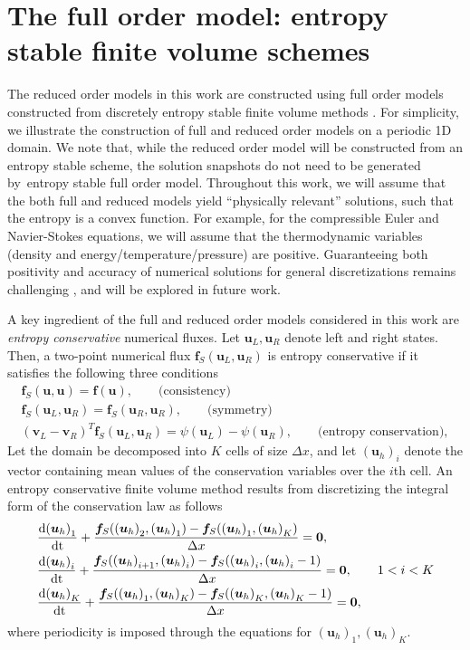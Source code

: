 \documentclass[review]{siamart171218}
\theoremstyle{assumption}
\newcommand{\td}[2]{\frac{{\rm d}#1}{{\rm d}{\rm #2}}}
\newcommand{\LRp}[1]{\left( #1 \right)}
\begin{document}
\section{The full order model: entropy stable finite volume schemes}
\label{sec:2}

The reduced order models in this work are constructed using full order models constructed from discretely entropy stable finite volume methods \cite{tadmor1987numerical}.  For simplicity, we illustrate the construction of full and reduced order models on a periodic 1D domain.  We note that, while the reduced order model will be constructed from an entropy stable scheme, the solution snapshots do not need to be generated by entropy stable full order model.  Throughout this work, we will assume that the both full and reduced models yield ``physically relevant'' solutions, such that the entropy is a convex function.  For example, for the compressible Euler and Navier-Stokes equations, we will assume that the thermodynamic variables (density and energy/temperature/pressure) are positive.  Guaranteeing both positivity and accuracy of numerical solutions for general discretizations remains challenging \cite{guermond2016invariant, guermond2019invariant}, and will be explored in future work.

A key ingredient of the full and reduced order models considered in this work are \textit{entropy conservative} numerical fluxes.  Let $\bm{u}_L, \bm{u}_R$ denote left and right states.  Then, a two-point numerical flux $\bm{f}_S(\bm{u}_L, \bm{u}_R)$ is entropy conservative if it satisfies the following three conditions
\begin{gather}
\bm{f}_S(\bm{u},\bm{u}) = \bm{f}(\bm{u}), \qquad \text{(consistency)} \label{eq:esflux}\\
\bm{f}_S(\bm{u}_L,\bm{u}_R) = \bm{f}_S(\bm{u}_R,\bm{u}_R), \qquad \text{(symmetry)} \nonumber\\
\LRp{\bm{v}_L-\bm{v}_R}^T\bm{f}_S(\bm{u}_L,\bm{u}_R) = \psi(\bm{u}_L) - \psi(\bm{u}_R), \qquad \text{(entropy conservation)}\nonumber,
\end{gather}
Let the domain be decomposed into $K$ cells of size $\Delta x$, and let ${\LRp{\bm{u}_h}_i}$ denote the vector containing mean values of the conservation variables over the $i$th cell.  An entropy conservative finite volume method results from discretizing the integral form of the conservation law as follows
\begin{align}
&\td{{\LRp{\bm{u}_h}_1}}{t} + \frac{\bm{f}_S({\LRp{\bm{u}_h}_2},\LRp{\bm{u}_h}_1)-\bm{f}_S({\LRp{\bm{u}_h}_1},{\LRp{\bm{u}_h}_K})}{\Delta x} = \bm{0}, \label{eq:nonlineqs1d}\\
&\td{{\LRp{\bm{u}_h}_i}}{t} + \frac{\bm{f}_S({\LRp{\bm{u}_h}_{i+1}},\LRp{\bm{u}_h}_i)-\bm{f}_S({\LRp{\bm{u}_h}_i},{\LRp{\bm{u}_h}_i-1})}{\Delta x} = \bm{0}, \qquad 1 < i < K \nonumber\\
&\td{{\LRp{\bm{u}_h}_K}}{t} + \frac{\bm{f}_S({\LRp{\bm{u}_h}_1},\LRp{\bm{u}_h}_K)-\bm{f}_S({\LRp{\bm{u}_h}_K},{\LRp{\bm{u}_h}_K-1})}{\Delta x} = \bm{0},\nonumber
\end{align}
where periodicity is imposed through the equations for ${\LRp{\bm{u}_h}_1}, {\LRp{\bm{u}_h}_K}$.  
\end{document}

